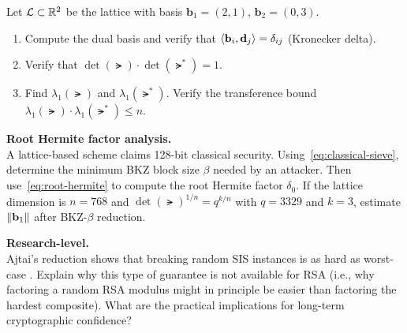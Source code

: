 \begin{prob}
\label{prob:ch06-dual}
Let $\mathcal{L}\subset\mathbb{R}^2$ be the lattice with basis $\mathbf{b}_1 = (2, 1)$, $\mathbf{b}_2 = (0, 3)$.
\begin{enumerate}
\item[(a)] Compute the dual basis and verify that $\left\langle \mathbf{b}_i, \mathbf{d}_j \right\rangle = \delta_{ij}$ (Kronecker delta).
\item[(b)] Verify that $\det(\lat)\cdot\det(\lat^*) = 1$.
\item[(c)] Find $\lambda_1(\lat)$ and $\lambda_1(\lat^*)$.  Verify the transference bound $\lambda_1(\lat)\cdot\lambda_1(\lat^*) \leq n$.
\end{enumerate}
\end{prob}

\begin{prob}
\label{prob:ch06-root-hermite}
\textbf{Root Hermite factor analysis.}\\
A lattice-based scheme claims 128-bit classical security.  Using~\eqref{eq:classical-sieve}, determine the minimum BKZ block size $\beta$ needed by an attacker.  Then use~\eqref{eq:root-hermite} to compute the root Hermite factor $\delta_0$.  If the lattice dimension is $n = 768$ and $\det(\lat)^{1/n} = q^{k/n}$ with $q = 3329$ and $k = 3$, estimate $\left\lVert \mathbf{b}_1 \right\rVert$ after BKZ-$\beta$ reduction.
\end{prob}

\begin{prob}
\label{prob:ch06-ajtai}
\textbf{Research-level.}\\
Ajtai's reduction shows that breaking random \textsc{SIS} instances is as hard as worst-case \sivp{}.  Explain why this type of guarantee is not available for RSA (i.e., why factoring a random RSA modulus might in principle be easier than factoring the hardest composite).  What are the practical implications for long-term cryptographic confidence?
\end{prob}
